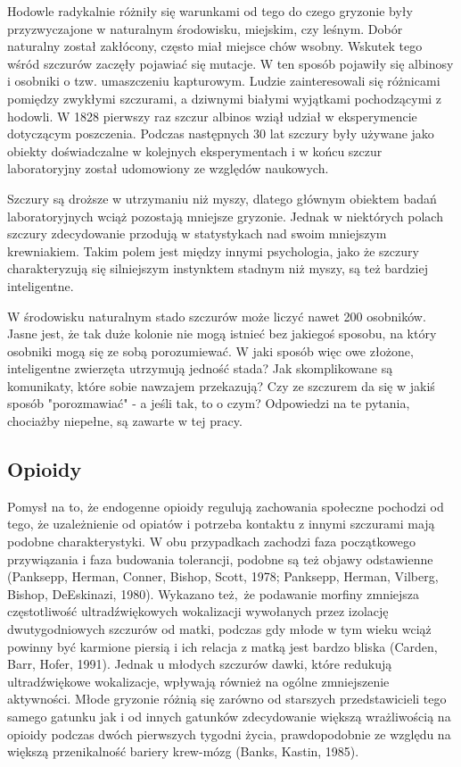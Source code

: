 \documentclass{psychol}
\begin{document}
Hodowle radykalnie różniły się warunkami od tego do czego gryzonie były przyzwyczajone w naturalnym środowisku, miejskim, czy leśnym. Dobór naturalny został zakłócony, często miał miejsce chów wsobny. Wskutek tego wśród szczurów zaczęły pojawiać się mutacje. W ten sposób pojawiły się albinosy i osobniki o tzw. umaszczeniu kapturowym. Ludzie zainteresowali się różnicami pomiędzy zwykłymi szczurami, a dziwnymi białymi wyjątkami pochodzącymi z hodowli. W 1828 pierwszy raz szczur albinos wziął udział w eksperymencie dotyczącym poszczenia. Podczas następnych 30 lat szczury były używane jako obiekty doświadczalne w kolejnych eksperymentach i w końcu szczur laboratoryjny został udomowiony ze względów naukowych.

Szczury są droższe w utrzymaniu niż myszy, dlatego głównym obiektem badań laboratoryjnych wciąż pozostają mniejsze gryzonie. Jednak w niektórych polach szczury zdecydowanie przodują w statystykach nad swoim mniejszym krewniakiem. Takim polem jest między innymi psychologia, jako że szczury charakteryzują się silniejszym instynktem stadnym niż myszy, są też bardziej inteligentne.

W środowisku naturalnym stado szczurów może liczyć nawet 200 osobników. Jasne jest, że tak duże kolonie nie mogą istnieć bez jakiegoś sposobu, na który osobniki mogą się ze sobą porozumiewać. W jaki sposób więc owe złożone, inteligentne zwierzęta utrzymują jedność stada? Jak skomplikowane są komunikaty, które sobie nawzajem przekazują? Czy ze szczurem da się w jakiś sposób "porozmawiać" - a jeśli tak, to o czym? Odpowiedzi na te pytania, chociażby niepełne, \colorbox{yellow!30}{są zawarte w tej pracy}.


\subsection{Opioidy}

Pomysł na to, że endogenne opioidy regulują zachowania społeczne pochodzi od tego, że uzależnienie od opiatów i potrzeba kontaktu z innymi szczurami mają podobne charakterystyki. W obu przypadkach zachodzi faza początkowego przywiązania i faza budowania tolerancji, podobne są też objawy odstawienne (Panksepp, Herman, Conner, Bishop, Scott, 1978; Panksepp, Herman, Vilberg, Bishop, DeEskinazi, 1980). Wykazano też, że podawanie morfiny zmniejsza częstotliwość ultradźwiękowych wokalizacji wywołanych przez izolację dwutygodniowych szczurów od matki, podczas gdy młode w tym wieku wciąż powinny być karmione piersią i ich relacja z matką jest bardzo bliska (Carden, Barr, Hofer, 1991).
Jednak u młodych szczurów dawki, które redukują ultradźwiękowe wokalizacje, wpływają również na ogólne zmniejszenie aktywności. Młode gryzonie różnią się zarówno od starszych przedstawicieli tego samego gatunku jak i od innych gatunków zdecydowanie większą wrażliwością na opioidy podczas dwóch pierwszych tygodni życia, prawdopodobnie ze względu na większą przenikalność bariery krew-mózg (Banks, Kastin, 1985).
\end{document}
